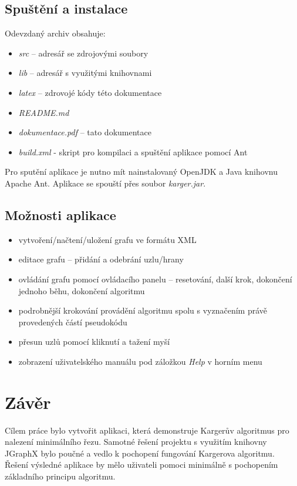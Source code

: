 \documentclass[../projekt.tex]{subfiles}
\begin{document}
\subsection{Spuštění a instalace}

Odevzdaný archiv obsahuje:

\begin{itemize}
	\item \textit{src} -- adresář se zdrojovými soubory
	\item \textit{lib} -- adresář s využitými knihovnami
	\item \textit{latex} -- zdrovojé kódy této dokumentace 
	\item \textit{README.md}
	\item \textit{dokumentace.pdf} -- tato dokumentace 
	\item \textit{build.xml} - skript pro kompilaci a spuštění aplikace pomocí Ant
\end{itemize}

\noindent Pro sputění aplikace je nutno mít nainstalovaný OpenJDK a Java knihovnu Apache Ant. Aplikace se spouští přes soubor \textit{karger.jar}.


\subsection{Možnosti aplikace}

\begin{itemize}
	\item vytvoření/načtení/uložení grafu ve formátu XML
	\item editace grafu -- přidání a odebrání uzlu/hrany
	\item ovládání grafu pomocí ovládacího panelu -- resetování, další krok, dokončení jednoho běhu, dokončení algoritmu
	\item podrobnější krokování provádění algoritmu spolu s vyznačením právě provedených částí pseudokódu
	\item přesun uzlů pomocí kliknutí a tažení myší
	\item zobrazení uživatelského manuálu pod záložkou \textit{Help} v horním menu
\end{itemize}



\section{Závěr}

Cílem práce bylo vytvořit aplikaci, která demonstruje Kargerův algoritmus pro
nalezení minimálního řezu. Samotné řešení projektu s využitím knihovny JGraphX
bylo poučné a vedlo k pochopení fungování Kargerova algoritmu. Řešení výsledné
aplikace by mělo uživateli pomoci minimálně s pochopením základního principu algoritmu.
\end{document}
